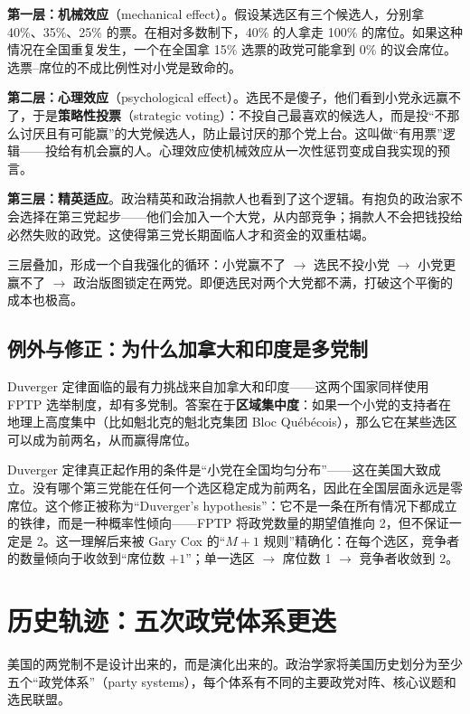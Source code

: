 \documentclass[12pt,a4paper]{ctexart}
\begin{document}
\textbf{第一层：机械效应}（mechanical effect）。假设某选区有三个候选人，分别拿 40\%、35\%、25\% 的票。在相对多数制下，40\% 的人拿走 100\% 的席位。如果这种情况在全国重复发生，一个在全国拿 15\% 选票的政党可能拿到 0\% 的议会席位。选票--席位的不成比例性对小党是致命的。

\textbf{第二层：心理效应}（psychological effect）。选民不是傻子，他们看到小党永远赢不了，于是\textbf{策略性投票}（strategic voting）：不投自己最喜欢的候选人，而是投``不那么讨厌且有可能赢''的大党候选人，防止最讨厌的那个党上台。这叫做``有用票''逻辑——投给有机会赢的人。心理效应使机械效应从一次性惩罚变成自我实现的预言。

\textbf{第三层：精英适应}。政治精英和政治捐款人也看到了这个逻辑。有抱负的政治家不会选择在第三党起步——他们会加入一个大党，从内部竞争；捐款人不会把钱投给必然失败的政党。这使得第三党长期面临人才和资金的双重枯竭。

三层叠加，形成一个自我强化的循环：小党赢不了 $\rightarrow$ 选民不投小党 $\rightarrow$ 小党更赢不了 $\rightarrow$ 政治版图锁定在两党。即便选民对两个大党都不满，打破这个平衡的成本也极高。

\subsection{例外与修正：为什么加拿大和印度是多党制}

Duverger 定律面临的最有力挑战来自加拿大和印度——这两个国家同样使用 FPTP 选举制度，却有多党制。答案在于\textbf{区域集中度}：如果一个小党的支持者在地理上高度集中（比如魁北克的魁北克集团 Bloc Québécois），那么它在某些选区可以成为前两名，从而赢得席位。

Duverger 定律真正起作用的条件是``小党在全国均匀分布''——这在美国大致成立。没有哪个第三党能在任何一个选区稳定成为前两名，因此在全国层面永远是零席位。这个修正被称为``Duverger's hypothesis''：它不是一条在所有情况下都成立的铁律，而是一种概率性倾向——FPTP 将政党数量的期望值推向 2，但不保证一定是 2。这一理解后来被 Gary Cox 的``$M+1$ 规则''精确化：在每个选区，竞争者的数量倾向于收敛到``席位数 $+1$''；单一选区 $\rightarrow$ 席位数 1 $\rightarrow$ 竞争者收敛到 2。

\section{历史轨迹：五次政党体系更迭}

美国的两党制不是设计出来的，而是演化出来的。政治学家将美国历史划分为至少五个``政党体系''（party systems），每个体系有不同的主要政党对阵、核心议题和选民联盟。
\end{document}
